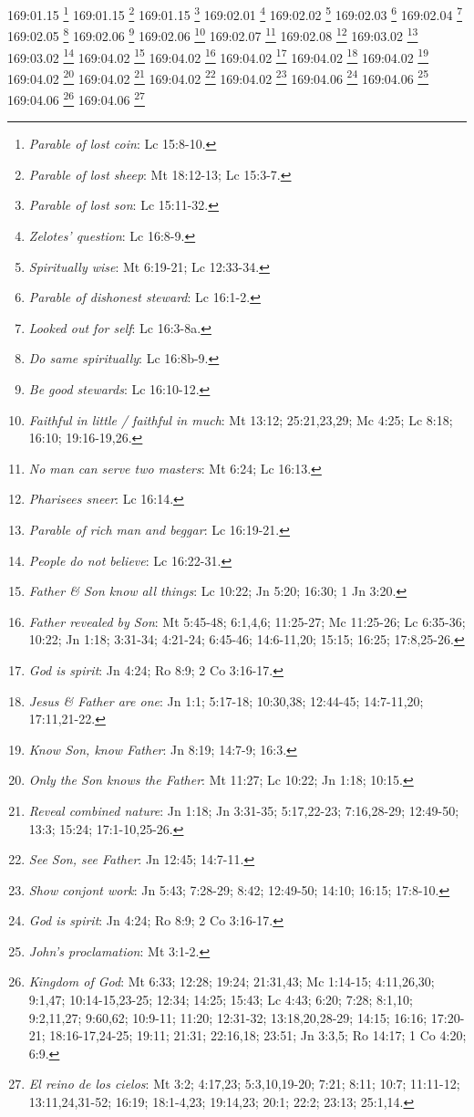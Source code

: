 169:01.15 \footnote{\textit{Parable of lost coin}: Lc 15:8-10.}
169:01.15 \footnote{\textit{Parable of lost sheep}: Mt 18:12-13; Lc 15:3-7.}
169:01.15 \footnote{\textit{Parable of lost son}: Lc 15:11-32.}
169:02.01 \footnote{\textit{Zelotes' question}: Lc 16:8-9.}
169:02.02 \footnote{\textit{Spiritually wise}: Mt 6:19-21; Lc 12:33-34.}
169:02.03 \footnote{\textit{Parable of dishonest steward}: Lc 16:1-2.}
169:02.04 \footnote{\textit{Looked out for self}: Lc 16:3-8a.}
169:02.05 \footnote{\textit{Do same spiritually}: Lc 16:8b-9.}
169:02.06 \footnote{\textit{Be good stewards}: Lc 16:10-12.}
169:02.06 \footnote{\textit{Faithful in little / faithful in much}: Mt 13:12; 25:21,23,29; Mc 4:25; Lc 8:18; 16:10; 19:16-19,26.}
169:02.07 \footnote{\textit{No man can serve two masters}: Mt 6:24; Lc 16:13.}
169:02.08 \footnote{\textit{Pharisees sneer}: Lc 16:14.}
169:03.02 \footnote{\textit{Parable of rich man and beggar}: Lc 16:19-21.}
169:03.02 \footnote{\textit{People do not believe}: Lc 16:22-31.}
169:04.02 \footnote{\textit{Father & Son know all things}: Lc 10:22; Jn 5:20; 16:30; 1 Jn 3:20.}
169:04.02 \footnote{\textit{Father revealed by Son}: Mt 5:45-48; 6:1,4,6; 11:25-27; Mc 11:25-26; Lc 6:35-36; 10:22; Jn 1:18; 3:31-34; 4:21-24; 6:45-46; 14:6-11,20; 15:15; 16:25; 17:8,25-26.}
169:04.02 \footnote{\textit{God is spirit}: Jn 4:24; Ro 8:9; 2 Co 3:16-17.}
169:04.02 \footnote{\textit{Jesus & Father are one}: Jn 1:1; 5:17-18; 10:30,38; 12:44-45; 14:7-11,20; 17:11,21-22.}
169:04.02 \footnote{\textit{Know Son, know Father}: Jn 8:19; 14:7-9; 16:3.}
169:04.02 \footnote{\textit{Only the Son knows the Father}: Mt 11:27; Lc 10:22; Jn 1:18; 10:15.}
169:04.02 \footnote{\textit{Reveal combined nature}: Jn 1:18; Jn 3:31-35; 5:17,22-23; 7:16,28-29; 12:49-50; 13:3; 15:24; 17:1-10,25-26.}
169:04.02 \footnote{\textit{See Son, see Father}: Jn 12:45; 14:7-11.}
169:04.02 \footnote{\textit{Show conjont work}: Jn 5:43; 7:28-29; 8:42; 12:49-50; 14:10; 16:15; 17:8-10.}
169:04.06 \footnote{\textit{God is spirit}: Jn 4:24; Ro 8:9; 2 Co 3:16-17.}
169:04.06 \footnote{\textit{John's proclamation}: Mt 3:1-2.}
169:04.06 \footnote{\textit{Kingdom of God}: Mt 6:33; 12:28; 19:24; 21:31,43; Mc 1:14-15; 4:11,26,30; 9:1,47; 10:14-15,23-25; 12:34; 14:25; 15:43; Lc 4:43; 6:20; 7:28; 8:1,10; 9:2,11,27; 9:60,62; 10:9-11; 11:20; 12:31-32; 13:18,20,28-29; 14:15; 16:16; 17:20-21; 18:16-17,24-25; 19:11; 21:31; 22:16,18; 23:51; Jn 3:3,5; Ro 14:17; 1 Co 4:20; 6:9.}
169:04.06 \footnote{\textit{El reino de los cielos}: Mt 3:2; 4:17,23; 5:3,10,19-20; 7:21; 8:11; 10:7; 11:11-12; 13:11,24,31-52; 16:19; 18:1-4,23; 19:14,23; 20:1; 22:2; 23:13; 25:1,14.}
